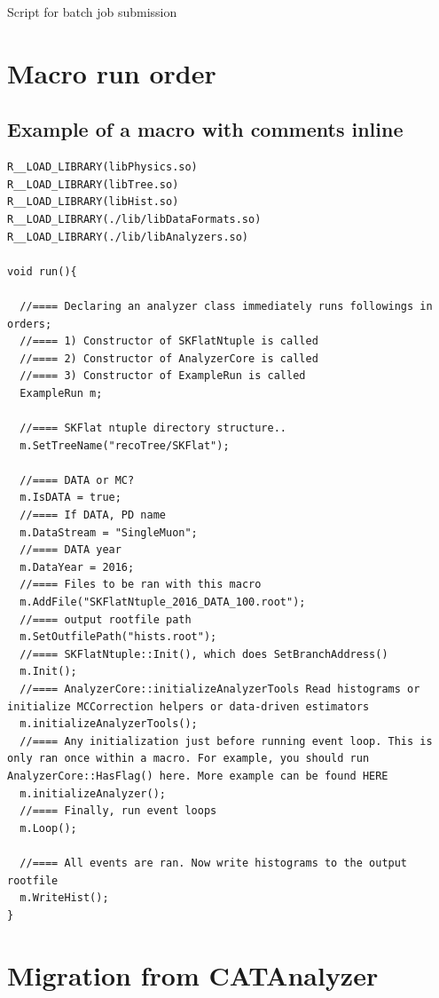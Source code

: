 \documentclass[12pt, a4paper, titlepage]{article}
\begin{document}
Script for batch job submission

\clearpage

\section{Macro run order}

\subsection{Example of a macro with comments inline}

\begin{lstlisting}
R__LOAD_LIBRARY(libPhysics.so)
R__LOAD_LIBRARY(libTree.so)
R__LOAD_LIBRARY(libHist.so)
R__LOAD_LIBRARY(./lib/libDataFormats.so)
R__LOAD_LIBRARY(./lib/libAnalyzers.so)

void run(){

  //==== Declaring an analyzer class immediately runs followings in orders; 
  //==== 1) Constructor of SKFlatNtuple is called
  //==== 2) Constructor of AnalyzerCore is called
  //==== 3) Constructor of ExampleRun is called
  ExampleRun m;

  //==== SKFlat ntuple directory structure..
  m.SetTreeName("recoTree/SKFlat");

  //==== DATA or MC?
  m.IsDATA = true;
  //==== If DATA, PD name
  m.DataStream = "SingleMuon";
  //==== DATA year
  m.DataYear = 2016;
  //==== Files to be ran with this macro
  m.AddFile("SKFlatNtuple_2016_DATA_100.root");
  //==== output rootfile path
  m.SetOutfilePath("hists.root");
  //==== SKFlatNtuple::Init(), which does SetBranchAddress()
  m.Init(); 
  //==== AnalyzerCore::initializeAnalyzerTools Read histograms or initialize MCCorrection helpers or data-driven estimators
  m.initializeAnalyzerTools();
  //==== Any initialization just before running event loop. This is only ran once within a macro. For example, you should run AnalyzerCore::HasFlag() here. More example can be found HERE
  m.initializeAnalyzer();
  //==== Finally, run event loops
  m.Loop();

  //==== All events are ran. Now write histograms to the output rootfile
  m.WriteHist();
}

\end{lstlisting}

\clearpage

\section{Migration from CATAnalyzer}
\end{document}
